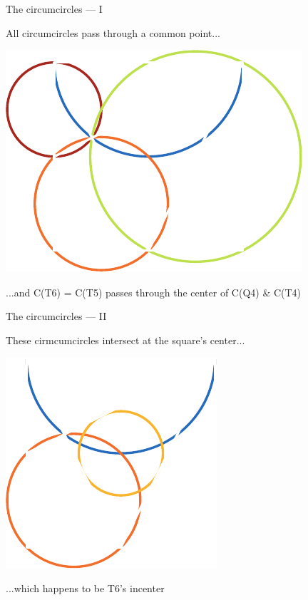 \documentclass[14pt]{beamer}
\begin{document}

    \begin{frame}{The circumcircles --- I}
        \begin{center}
            All circumcircles pass through a common point...
        \end{center}
        \hspace{3.92em} \includegraphics[scale=1.0]{figures/figure019c.pdf} \\
        \begin{center}
            \footnotesize ...and C(T6) = C(T5) passes through the center of C(Q4) \& C(T4)
        \end{center}
    \end{frame}


    \begin{frame}{The circumcircles --- II}
        \begin{center}
            These cirmcumcircles intersect at the square's center...
        \end{center}
        \vspace{0.90em}
        \hspace{5.25em} \includegraphics[scale=1.0]{figures/figure019g.pdf} \\
        \begin{center}
            ...which happens to be T6's incenter
        \end{center}
    \end{frame}
\end{document}
